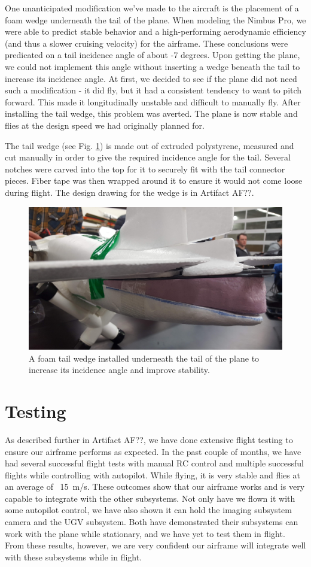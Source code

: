 \documentclass[]{auvsi_doc}
\begin{document}
One unanticipated modification we've made to the aircraft is the placement of a foam wedge underneath the tail of the plane. When modeling the Nimbus Pro, we were able to predict stable behavior and a high-performing aerodynamic efficiency (and thus a slower cruising velocity) for the airframe. These conclusions were predicated on a tail incidence angle of about -7 degrees. Upon getting the plane, we could not implement this angle without inserting a wedge beneath the tail to increase its incidence angle. At first, we decided to see if the plane did not need such a modification - it did fly, but it had a consistent tendency to want to pitch forward. This made it longitudinally unstable and difficult to manually fly. After installing the tail wedge, this problem was averted. The plane is now stable and flies at the design speed we had originally planned for.

The tail wedge (see Fig. \ref{fig:wedge}) is made out of extruded polystyrene, measured and cut manually in order to give the required incidence angle for the tail. Several notches were carved into the top for it to securely fit with the tail connector pieces. Fiber tape was then wrapped around it to ensure it would not come loose during flight. The design drawing for the wedge is in Artifact AF??.

\begin{figure}[h!]
	\centering
	\includegraphics[width=.75\columnwidth]{figs/tailwedge}
	\caption{A foam tail wedge installed underneath the tail of the plane to increase its incidence angle and improve stability.}
	\label{fig:wedge}
\end{figure}

\section{Testing}
As described further in Artifact AF??, we have done extensive flight testing to ensure our airframe performs as expected. In the past couple of months, we have had several successful flight tests with manual RC control and multiple successful flights while controlling with autopilot. While flying, it is very stable and flies at an average of ~15\ m/s. These outcomes show that our airframe works and is very capable to integrate with the other subsystems. Not only have we flown it with some autopilot control, we have also shown it can hold the imaging subsystem camera and the UGV subsystem. Both have demonstrated their subsystems can work with the plane while stationary, and we have yet to test them in flight. From these results, however, we are very confident our airframe will integrate well with these subsystems while in flight. 
\end{document}
